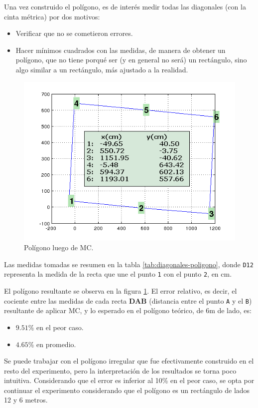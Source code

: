 \documentclass[main]{subfiles}
\begin{document}
Una vez construido el polígono, es de interés medir todas las diagonales (con la cinta métrica) por dos motivos:
\begin{itemize}
\item Verificar que no se cometieron errores.
\item Hacer mínimos cuadrados con las medidas, de manera de obtener un polígono, que no tiene porqué ser (y en general no será) un rectángulo, sino algo similar a un rectángulo, más ajustado a la realidad.
\end{itemize}

\begin{figure}
\vspace{-20pt}
  \includegraphics[width=.5\textwidth]{./pics_gps/pol_mc.png}
\caption{Polígono luego de MC.}
\label{fig:pol_mc.png}
\vspace{-20pt}
\end{figure}
Las medidas tomadas se resumen en la tabla \ref{tab:diagonales-poligono}, donde \verb+D12+ representa la medida de la recta que une el punto \verb+1+ con el punto \verb+2+, en cm.

El polígono resultante se observa en la figura \ref{fig:pol_mc.png}. El error relativo, es decir, el cociente entre las medidas de cada recta \textbf{DAB} (distancia entre el punto \verb+A+ y el \verb+B+) resultante de aplicar MC, y lo esperado en el polígono teórico, de 6m de lado, es:

\begin{itemize}
\item $9.51\%$ en el peor caso.
\item $4.65\%$ en promedio.
\end{itemize}

Se puede trabajar con el pol\'igono irregular que fue efectivamente construido en el resto del experimento, pero la interpretación de los resultados se torna poco intuitiva. Considerando que el error es inferior al 10\% en el peor caso, se opta por continuar el experimento considerando que el pol\'igono es un rect\'angulo de lados 12 y 6 metros.
\end{document}
